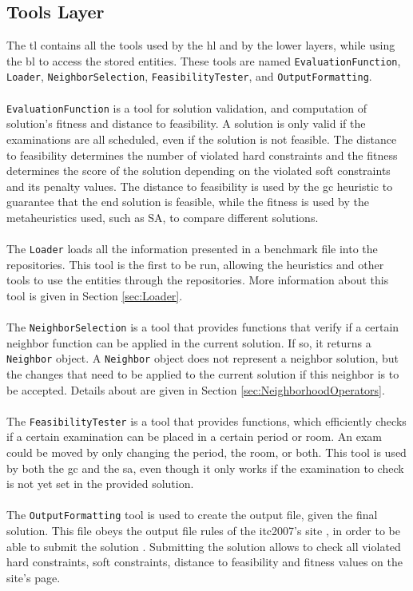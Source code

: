 \subsection{Tools Layer}
The \gls{tl} contains all the tools used by the \gls{hl} and by the lower layers, while using the \gls{bl} to access the stored entities. These tools are named \verb+EvaluationFunction+, \verb+Loader+, \verb+NeighborSelection+, \verb+FeasibilityTester+, and \verb+OutputFormatting+.\\
\\
\verb+EvaluationFunction+ is a tool  for solution validation, and computation of solution's fitness and distance to feasibility. A solution is only valid if the examinations are all scheduled, even if the solution is not feasible. The distance to feasibility determines the number of violated hard constraints and the fitness determines the score of the solution depending on the violated soft constraints and its penalty values. The distance to feasibility is used by the \gls{gc} heuristic to guarantee that the end solution is feasible, while the fitness is used by the metaheuristics used, such as SA, to compare different solutions.\\
\\
The \verb+Loader+ loads all the information presented in a benchmark file into the repositories. This tool is the first to be run, allowing the heuristics and other tools to use the entities through the repositories. More information about this tool is given in Section \ref{sec:Loader}.\\
\\
The \verb+NeighborSelection+ is a tool that provides functions that verify if a certain neighbor function can be applied in the current solution. If so, it returns a \verb+Neighbor+ object. A \verb+Neighbor+ object does not represent a neighbor solution, but the changes that need to be applied to the current solution if this neighbor is to be accepted. Details about are given in Section \ref{sec:NeighborhoodOperators}.\\
\\
The \verb+FeasibilityTester+ is a tool that provides functions, which efficiently checks if a certain examination can be placed in a certain period or room. An exam could be moved by only changing the period, the room, or both. This tool is used by both the \gls{gc} and the \gls{sa}, even though it only works if the examination to check is not yet set in the provided solution.\\
\\
The \verb+OutputFormatting+ tool is used to create the output file, given the final solution. This file obeys the output file rules of the \gls{itc2007}'s site \cite{McCollum2007b}, in order to be able to submit the solution \cite{McCollum2007c}. Submitting the solution allows to check all violated hard constraints, soft constraints, distance to feasibility and fitness values on the site's page.

